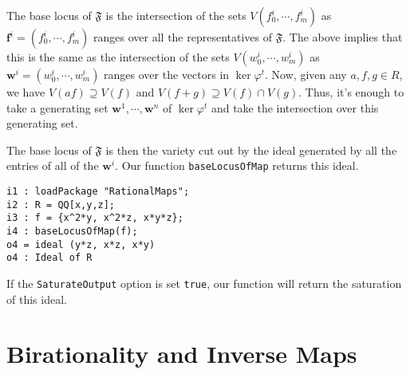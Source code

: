 \documentclass[11pt]{amsart}
\numberwithin{equation}{theorem}
\renewcommand{\:}{\colon}
\theoremstyle{theorem}
\begin{document}
The base locus of $\mathfrak{F}$ is the intersection of the sets $V(f^i_0, \cdots, f^i_m)$ as $\mathbf{f}^i = (f^i_0, \cdots, f^i_m)$ ranges over all the representatives of $\mathfrak{F}$. The above implies that this is the same as the intersection of the sets $V(w^i_0,\cdots, w^i_m)$ as $\mathbf{w}^i = (w^i_0, \cdots, w^i_m)$ ranges over the vectors in $\ker \varphi^t$. Now, given any $a, f, g\in R$, we have $V(af) \supseteq V(f)$ and $V(f + g) \supseteq V(f)\cap V(g)$. Thus, it's enough to take a generating set $\mathbf w^1, \cdots, \mathbf w^n$ of $\ker \varphi^t$  and take the intersection over this generating set.

The base locus of $\mathfrak{F}$ is then the variety cut out by the ideal generated by all the entries of all of the $\mathbf w^i$. Our function {\tt baseLocusOfMap}  returns this ideal.
{\scriptsize\color{blue}
\begin{verbatim}
i1 : loadPackage "RationalMaps";
i2 : R = QQ[x,y,z];
i3 : f = {x^2*y, x^2*z, x*y*z};
i4 : baseLocusOfMap(f);
o4 = ideal (y*z, x*z, x*y)
o4 : Ideal of R
\end{verbatim}
}
{\normalsize}
 If the \verb=SaturateOutput= option is set {\tt true}, our function will return the saturation of this ideal.


\section{Birationality and Inverse Maps}
\end{document}
